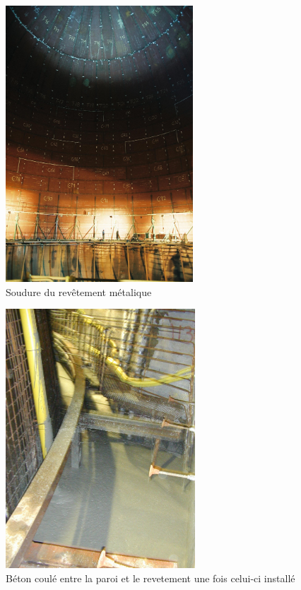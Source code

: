 \documentclass[11pt,french,a4paper]{article}
\begin{document}
\begin{figure}[!h]
  \centering
  \includegraphics[width=.8\linewidth]{image/annexe/chap2/soudure.png}
  \caption{Soudure du revêtement métalique}
  \end{figure}
\begin{figure}[!h]
  \centering
  \includegraphics[width=.8\linewidth]{image/annexe/chap2/beton.png}
  \caption{Béton coulé entre la paroi et le revetement une fois celui-ci installé}
  \end{figure}
\end{document}
